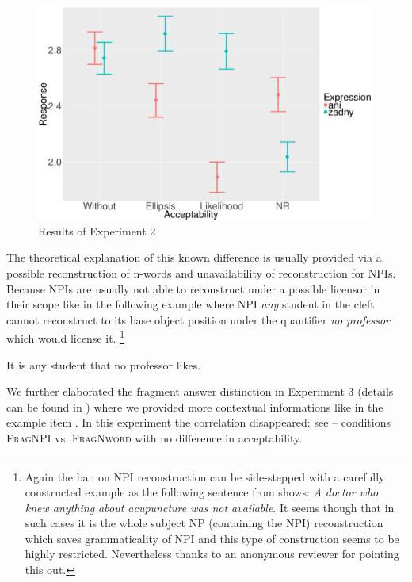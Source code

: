 \documentclass[output=paper,
]{langscibook}
\begin{document}
\begin{figure}
\centering
\includegraphics[scale=0.25]{figures/mean-sum.pdf}
\caption{Results of Experiment 2}\label{fig:exp2}
\end{figure}

\noindent The theoretical explanation of this known difference is usually provided via a possible reconstruction of n-words and unavailability of reconstruction for NPIs. Because NPIs are usually not able to reconstruct under a possible licensor in their scope \citep{de1998licensing} like in the following example where NPI \textit{any} student in the cleft cannot reconstruct to its base object position under the quantifier \textit{no professor} which would license it.%
\footnote{Again the ban on NPI reconstruction can be side-stepped with a carefully constructed example as the following sentence from \cite[p.17]{uribe1994interface} shows: \textit{A doctor who knew anything about acupuncture was not available}. It seems though that in such cases it is the whole subject NP (containing the NPI) reconstruction which saves grammaticality of NPI and this type of construction seems to be highly restricted. Nevertheless thanks to an anonymous reviewer for pointing this out.}

\ea *It is any student that no professor likes.
\z

\noindent We further elaborated the fragment answer distinction in Experiment 3 (details can be found in \citealt{docekaldotlacilsubber}) where we provided more contextual informations like in the example item . In this experiment the correlation disappeared: see  -- conditions \textsc{FragNPI} vs. \textsc{FragNword} with no difference in acceptability.
\end{document}
